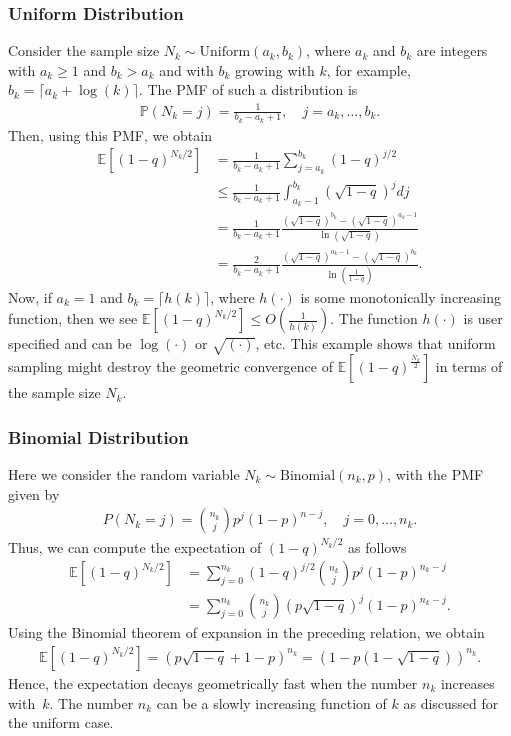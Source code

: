 \documentclass{article}
\newcommand{\EXP}[1]
{\mathbb{E}\!\left[#1\right] }
\theoremstyle{plain}
\theoremstyle{definition}
\theoremstyle{remark}
\begin{document}
\subsubsection{Uniform Distribution}
Consider the sample size $N_k \sim \text{Uniform}(a_k, b_k)$, where $a_k$ and $b_k$ are integers with $a_k\ge 1$ and $b_k>a_k$ and with $b_k$  growing  with $k$, for example, $b_k=\lceil a_k+\log(k)\rceil$. The PMF of such a distribution is
\begin{align}
    \mathbb{P}(N_k = j) = \frac{1}{ b_k - a_k + 1}, \quad j = a_k, \dots, b_k . \nonumber
\end{align}
Then, using this PMF, we obtain
\begin{align*}
    \EXP{(1 - q)^{N_k/2}} &= \frac{1}{b_k - a_k + 1} \sum_{j = a_k}^{b_k} (1 - q)^{j/2} \\
    & \leq \frac{1}{b_k - a_k + 1} \int_{a_k-1}^{b_k} \left(\sqrt{1 - q}\right)^{j} dj \\
    & = \frac{1}{b_k - a_k + 1} \frac{\left(\sqrt{1 - q}\right)^{b_k} - \left(\sqrt{1 - q}\right)^{a_k-1}}{\ln\left(\sqrt{1 - q}\right)} \\
    &= \frac{2}{b_k - a_k + 1} \frac{\left(\sqrt{1 - q}\right)^{a_k-1} - \left(\sqrt{1 - q}\right)^{b_k}}{\ln\left(\frac{1}{1 - q}\right)}.
\end{align*}
Now, if $a_k = 1$ and $b_k = \lceil h(k)\rceil$, where $h(\cdot)$ is some monotonically increasing function, then we see $\EXP{(1 - q)^{N_k/2}} \leq O \left(\frac{1}{h(k)} \right)$. The function $h(\cdot)$ is user specified and can be $\log(\cdot)$ or $\sqrt{(\cdot)}$, etc. This example shows that uniform sampling might destroy the geometric convergence of $\EXP{(1-q)^{\frac{N_{k}}{2}}}$ in terms of the sample size $N_k$.

\subsubsection{Binomial Distribution}\label{appdx_bin_dist}
Here we consider the random variable $N_k \sim \text{Binomial}(n_k, p)$, with the PMF given by
\begin{align}
    P(N_k = j) = \binom{n_k}{j} p^j (1 - p)^{n - j}, \quad j = 0, \dots, n_k . \nonumber
\end{align}
Thus, we can compute the expectation of $(1-q)^{N_k/2}$ as
follows
\begin{align*}
    \EXP{(1-q)^{N_k/2}} &= \sum_{j=0}^{n_k} (1 - q)^{j/2} \binom{n_k}{j} p^j (1 - p)^{n_k - j} \\
    & = \sum_{j=0}^{n_k} \binom{n_k}{j} \left( p \sqrt{1 - q}\right)^j (1 - p)^{n_k - j} .
\end{align*}
Using the Binomial theorem of expansion in the preceding relation, we obtain
\begin{align*}
    \EXP{(1-q)^{N_k/2}} = \left( p \sqrt{1 - q} + 1 - p \right)^{n_k} = \left( 1 - p \left( 1 - \sqrt{1 - q} \right) \right)^{n_k} .
\end{align*}
Hence, the expectation decays geometrically fast when the number $n_k$ increases with~$k$. The number $n_k$ can be a slowly increasing function of $k$ as discussed for the uniform case.
\end{document}
